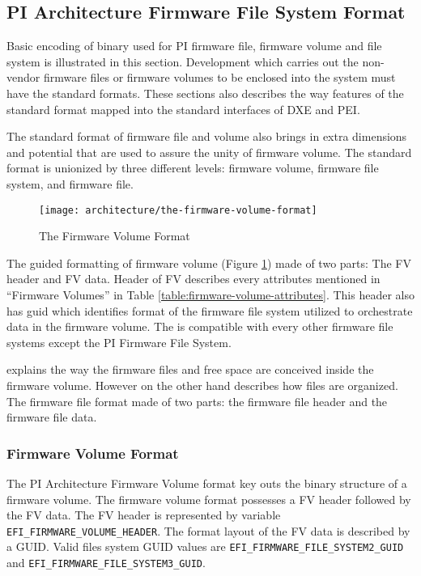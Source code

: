 \subsection{PI Architecture Firmware File System Format}
Basic encoding of binary used for PI firmware file, firmware volume and file system is illustrated in this section. Development which carries out the non-vendor firmware files or firmware volumes to be enclosed into the system must have the standard formats. These sections also describes the way features of the standard format mapped into the standard interfaces of DXE and PEI.

The standard format of firmware file and volume also brings in extra dimensions and potential that are used to assure the unity of firmware volume. The standard format is unionized by three different levels: firmware volume, firmware file system, and firmware file.

\begin{figure}[!htbp]
	\centering
	\texttt{[image: architecture/the-firmware-volume-format]}
	\caption{The Firmware Volume Format}\label{fig:architecture-the-firmware-volume-format}
\end{figure}

The guided formatting of firmware volume (Figure \ref{fig:architecture-the-firmware-volume-format}) made of two parts: 
The FV header and FV data. Header of FV describes every attributes mentioned in “Firmware Volumes” in Table \ref{table:firmware-volume-attributes}. This header also has \gls{guid} which identifies format of the firmware file system utilized to orchestrate data in the firmware volume. The  is compatible with every other firmware file systems except the PI Firmware File System.

 explains the way the firmware files and free space are conceived inside the firmware volume. However on the other hand  describes how files are organized. The firmware file format made of two parts: the firmware file header and the firmware file data.

\subsubsection{Firmware Volume Format}
The PI Architecture Firmware Volume format key outs the binary structure of a firmware volume. The firmware volume format possesses a FV header followed by the FV data. The FV header is represented by variable \verb|EFI_FIRMWARE_VOLUME_HEADER|.
The format layout of the FV data is described by a GUID. Valid files system GUID values are \verb|EFI_FIRMWARE_FILE_SYSTEM2_GUID| and \verb|EFI_FIRMWARE_FILE_SYSTEM3_GUID|.

